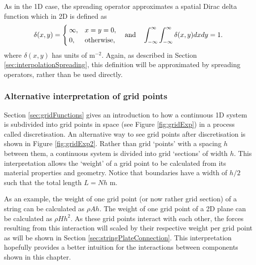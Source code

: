 As in the 1D case, the spreading operator approximates a spatial Dirac delta function which in 2D is defined as 
\begin{equation}\label{eq:spatialDirac2D}
    \delta(x,y)= \begin{cases}
        \infty, & x = y = 0,\\
        0, & \text{otherwise},
    \end{cases} \quad \text{and} \quad \int_{-\infty}^{\infty} \int_{-\infty}^{\infty} \delta(x,y)dxdy = 1.
\end{equation}
where $\delta(x,y)$ has units of m$^{-2}$. Again, as described in Section \ref{sec:interpolationSpreading}, this definition will be approximated by spreading operators, rather than be used directly. 

\subsubsection{Alternative interpretation of grid points}
Section \ref{sec:gridFunctions} gives an introduction to how a continuous 1D system is subdivided into grid points in space (see Figure \ref{fig:gridExp}) in a process called discretisation. An alternative way to see grid points after discretisation is shown in Figure \ref{fig:gridExp2}. Rather than grid `points' with a spacing $h$ between them, a continuous system is divided into grid `sections' of width $h$. This interpretation allows the `weight' of a grid point to be calculated from its material properties and geometry. Notice that boundaries have a width of $h/2$ such that the total length $L = Nh$ m.

As an example, the weight of one grid point (or now rather grid section) of a string can be calculated as $\rho A h$. The weight of one grid point of a 2D plane can be calculated as $\rho H h^2$. As these grid points interact with each other, the forces resulting from this interaction will scaled by their respective weight per grid point as will be shown in Section \ref{sec:stringPlateConnection}.
This interpretation hopefully provides a better intuition for the interactions between components shown in this chapter. 

